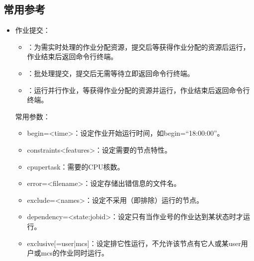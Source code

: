 \documentclass[a4paper,12pt,english]{sphinxmanual}
\begin{document}
\subsection{常用参考}
\label{\detokenize{slurm/slurm:id6}}\begin{itemize}
\item {} 
\sphinxAtStartPar
作业提交：
\begin{itemize}
\item {} 
\sphinxAtStartPar
{}：为需实时处理的作业分配资源，提交后等获得作业分配的资源后运行，作业结束后返回命令行终端。

\item {} 
\sphinxAtStartPar
{}：批处理提交，提交后无需等待立即返回命令行终端。

\item {} 
\sphinxAtStartPar
{}：运行并行作业，等获得作业分配的资源并运行，作业结束后返回命令行终端。

\end{itemize}

\sphinxAtStartPar
常用参数：
\begin{itemize}
\item {} 
\sphinxAtStartPar
\sphinxhyphen{}\sphinxhyphen{}begin=<time>：设定作业开始运行时间，如\sphinxhyphen{}\sphinxhyphen{}begin=“18:00:00”。

\item {} 
\sphinxAtStartPar
\sphinxhyphen{}\sphinxhyphen{}constraints<features>：设定需要的节点特性。

\item {} 
\sphinxAtStartPar
\sphinxhyphen{}\sphinxhyphen{}cpu\sphinxhyphen{}per\sphinxhyphen{}task：需要的CPU核数。

\item {} 
\sphinxAtStartPar
\sphinxhyphen{}\sphinxhyphen{}error=<filename>：设定存储出错信息的文件名。

\item {} 
\sphinxAtStartPar
\sphinxhyphen{}\sphinxhyphen{}exclude=<names>：设定不采用（即排除）运行的节点。

\item {} 
\sphinxAtStartPar
\sphinxhyphen{}\sphinxhyphen{}dependency=<state:jobid>：设定只有当作业号的作业达到某状态时才运行。

\item {} 
\sphinxAtStartPar
\sphinxhyphen{}\sphinxhyphen{}exclusive{[}=user|mcs{]}：设定排它性运行，不允许该节点有它人或某user用户或mcs的作业同时运行。


\end{itemize}
\end{itemize}
\end{document}

